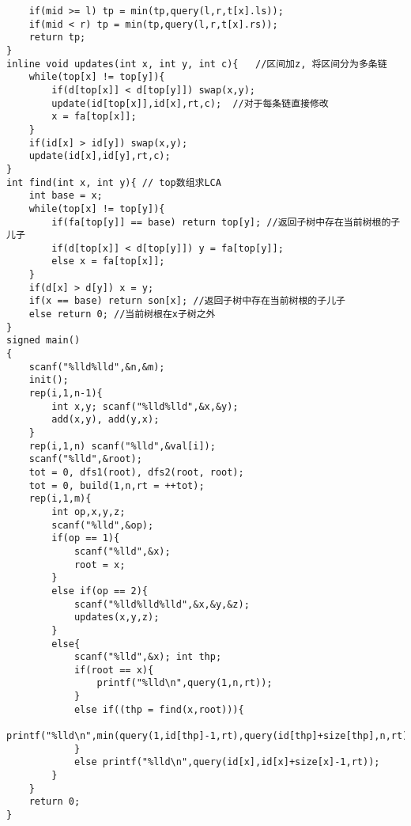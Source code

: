 \documentclass[twoside]{article}
\begin{document}
\begin{lstlisting}
	if(mid >= l) tp = min(tp,query(l,r,t[x].ls));
	if(mid < r) tp = min(tp,query(l,r,t[x].rs));
	return tp;
}
inline void updates(int x, int y, int c){	//区间加z, 将区间分为多条链
	while(top[x] != top[y]){
		if(d[top[x]] < d[top[y]]) swap(x,y);
		update(id[top[x]],id[x],rt,c);	//对于每条链直接修改
		x = fa[top[x]];
	}
	if(id[x] > id[y]) swap(x,y);
	update(id[x],id[y],rt,c);
}
int find(int x, int y){	// top数组求LCA
	int base = x;
	while(top[x] != top[y]){
		if(fa[top[y]] == base) return top[y]; //返回子树中存在当前树根的子儿子
		if(d[top[x]] < d[top[y]]) y = fa[top[y]];
		else x = fa[top[x]];
	}
	if(d[x] > d[y]) x = y;
	if(x == base) return son[x]; //返回子树中存在当前树根的子儿子
	else return 0; //当前树根在x子树之外
}
signed main()
{
	scanf("%lld%lld",&n,&m);
	init();
	rep(i,1,n-1){
		int x,y; scanf("%lld%lld",&x,&y);
		add(x,y), add(y,x);
	}
	rep(i,1,n) scanf("%lld",&val[i]);
	scanf("%lld",&root);
	tot = 0, dfs1(root), dfs2(root, root);
	tot = 0, build(1,n,rt = ++tot);
	rep(i,1,m){
		int op,x,y,z;
		scanf("%lld",&op);
		if(op == 1){
			scanf("%lld",&x);
			root = x;
		}
		else if(op == 2){
			scanf("%lld%lld%lld",&x,&y,&z);
			updates(x,y,z);
		}
		else{
			scanf("%lld",&x); int thp;
			if(root == x){
				printf("%lld\n",query(1,n,rt));
			}
			else if((thp = find(x,root))){
				printf("%lld\n",min(query(1,id[thp]-1,rt),query(id[thp]+size[thp],n,rt)));
			}
			else printf("%lld\n",query(id[x],id[x]+size[x]-1,rt));
		}
	}
	return 0;
}\end{lstlisting}
\end{document}
